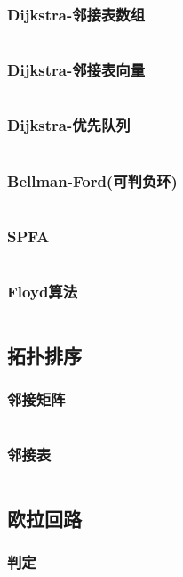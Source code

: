     \subsubsection{Dijkstra-邻接表数组}
      \inputminted{cpp}{src/5_图论/3_最短路/2_Dijkstra-邻接表数组.cpp}
    \subsubsection{Dijkstra-邻接表向量}
      \inputminted{cpp}{src/5_图论/3_最短路/3_Dijkstra-邻接表向量.cpp}
    \subsubsection{Dijkstra-优先队列}
      \inputminted{cpp}{src/5_图论/3_最短路/4_Dijkstra-优先队列.cpp}
    \subsubsection{Bellman-Ford(可判负环)}
      \inputminted{cpp}{src/5_图论/3_最短路/5_Bellman-Ford(可判负环).cpp}
    \subsubsection{SPFA}
      \inputminted{cpp}{src/5_图论/3_最短路/6_SPFA.cpp}
    \subsubsection{Floyd算法}
      \inputminted{cpp}{src/5_图论/3_最短路/7_Floyd算法.cpp}
  \subsection{拓扑排序}
    \subsubsection{邻接矩阵}
      \inputminted{cpp}{src/5_图论/4_拓扑排序/1_邻接矩阵.cpp}
    \subsubsection{邻接表}
      \inputminted{cpp}{src/5_图论/4_拓扑排序/2_邻接表.cpp}
  \subsection{欧拉回路}
    \subsubsection{判定}
      
